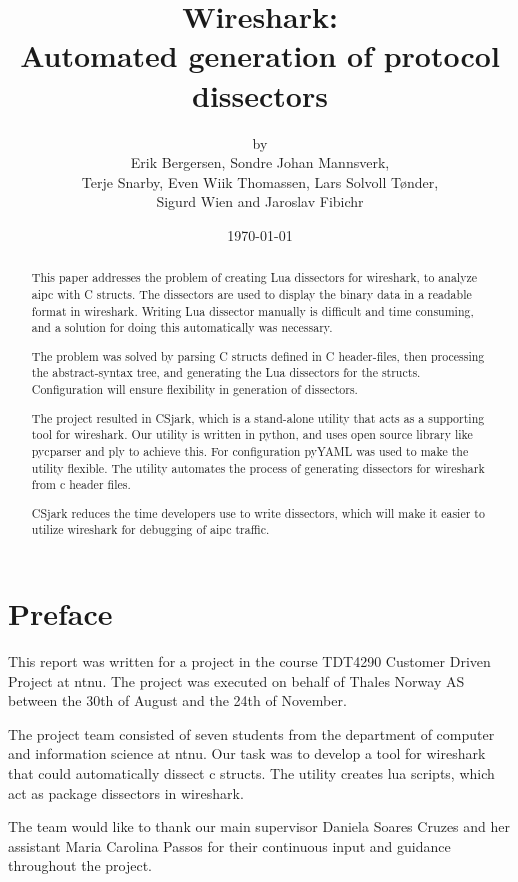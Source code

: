 \documentclass[a4paper, 11pt]{report}
\title{Wireshark:\\ Automated generation of protocol dissectors}
\author{by\\ Erik Bergersen, Sondre Johan Mannsverk,\\ Terje Snarby,
		Even Wiik Thomassen, Lars Solvoll Tønder,\\ Sigurd Wien
		and Jaroslav Fibichr}
\date{\today}
\begin{document}


\begin{abstract}
This paper addresses the problem of creating Lua dissectors for \Gls{wireshark}, 
to analyze \gls{aipc} with C structs. The dissectors are used to display the 
binary data in a readable format in \Gls{wireshark}. Writing Lua dissector 
manually is difficult and time consuming, and a solution for doing this 
automatically was necessary.  

The problem was solved by parsing C structs defined in C header-files, then 
processing the abstract-syntax tree, and generating the Lua dissectors 
for the structs. Configuration will ensure flexibility in generation of 
dissectors.

The project resulted in CSjark, which is a stand-alone \gls{utility} that acts 
as a supporting tool for \Gls{wireshark}. Our \gls{utility} is written in 
\Gls{python}, and uses open source {library} like \gls{pycparser} and 
\gls{ply} to achieve this. For configuration pyYAML was used to make the 
utility flexible. The \gls{utility} automates the process of generating 
\glspl{dissector} for \Gls{wireshark} from \Gls{c} \gls{header} files. 

CSjark reduces the time developers use to write dissectors, which 
will make it easier to utilize \Gls{wireshark} for debugging of  \gls{aipc} 
traffic.
\end{abstract}

\chapter*{Preface}
This report was written for a project in the course TDT4290 Customer Driven
Project at \Gls{ntnu}. The project
was executed on behalf of Thales Norway AS between the 30th of August and the
24th of November.

The project team consisted of seven students from the department of computer
and information science at \Gls{ntnu}. Our task was to develop a tool for \Gls{wireshark}
that could automatically dissect \Gls{c} \glspl{struct}. The \gls{utility} creates \Gls{lua} \glspl{script},
which act as package \glspl{dissector} in \Gls{wireshark}. 

The team would like to thank our main supervisor Daniela Soares Cruzes
and her assistant Maria Carolina Passos for their continuous input and
guidance throughout the project.
\end{document}
